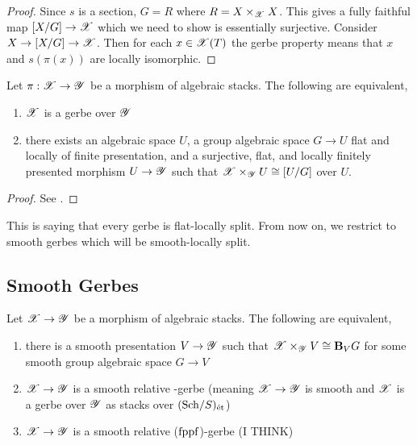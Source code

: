 \documentclass[12pt]{article}
\begin{document}
\begin{proof}
Since $s$ is a section, $G = R$ where $R = X \times_{\mathscr{X}} X$. This gives a fully faithful map $[X/G] \to \mathscr{X}$ which we need to show is essentially surjective. Consider $X \to [X/G] \to \mathscr{X}$. Then for each $x \in \mathscr{X}(T)$ the gerbe property means that $x$ and $s(\pi(x))$ are locally isomorphic. 
\end{proof}

\begin{prop}
Let $\pi : \mathscr{X} \to \mathscr{Y}$ be a morphism of algebraic stacks. The following are equivalent,
\begin{enumerate}
\item $\mathscr{X}$ is a gerbe over $\mathscr{Y}$
\item there exists an algebraic space $U$, a group algebraic space $G \to U$ flat and locally of finite presentation, and a surjective, flat, and locally finitely presented morphism $U \to \mathscr{Y}$ such that $\mathscr{X} \times_{\mathscr{Y}} U \cong [U / G]$ over $U$.
\end{enumerate}
\end{prop}

\begin{proof}
See . 
\end{proof}

\begin{rmk}
This is saying that every gerbe is flat-locally split. From now on, we restrict to smooth gerbes which will be smooth-locally split.
\end{rmk}


\subsection{Smooth Gerbes}

\begin{prop}
Let $\mathscr{X} \to \mathscr{Y}$ be a morphism of algebraic stacks. The following are equivalent,
\begin{enumerate}
\item there is a smooth presentation $V \to \mathscr{Y}$ such that $\mathscr{X} \times_{\mathscr{Y}} V \cong \mathbf{B}_V G$ for some smooth group algebraic space $G \to V$
\item $\mathscr{X} \to \mathscr{Y}$ is a smooth relative \etale-gerbe (meaning $\mathscr{X} \to \mathscr{Y}$ is smooth and $\mathscr{X}$ is a gerbe over $\mathscr{Y}$ as stacks over $(\mathrm{Sch}/S)_{\text{\'{e}t}}$)
\item $\mathscr{X} \to \mathscr{Y}$ is a smooth relative ($\mathrm{fppf}$)-gerbe (I THINK)
\end{enumerate}
\end{prop}
\end{document}
